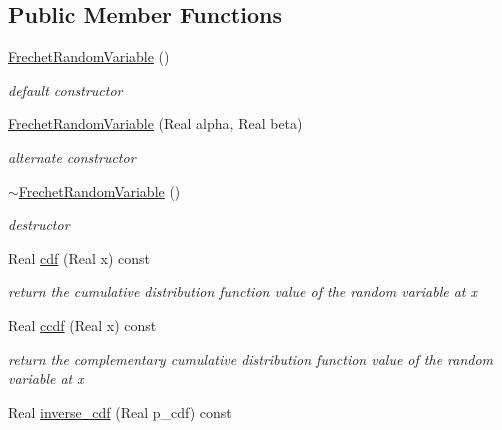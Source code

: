 \subsection*{Public Member Functions}
\begin{DoxyCompactItemize}
\item 
\hyperlink{classPecos_1_1FrechetRandomVariable_ae4779be11834d22e5aabb3d4c8a4f9ca}{Frechet\+Random\+Variable} ()\label{classPecos_1_1FrechetRandomVariable_ae4779be11834d22e5aabb3d4c8a4f9ca}

\begin{DoxyCompactList}\small\item\em default constructor \end{DoxyCompactList}\item 
\hyperlink{classPecos_1_1FrechetRandomVariable_a80a163a727244db9fd1a5eae1bc2137d}{Frechet\+Random\+Variable} (Real alpha, Real beta)\label{classPecos_1_1FrechetRandomVariable_a80a163a727244db9fd1a5eae1bc2137d}

\begin{DoxyCompactList}\small\item\em alternate constructor \end{DoxyCompactList}\item 
\hyperlink{classPecos_1_1FrechetRandomVariable_a06711dd01877399b0637eb2fde1a13f2}{$\sim$\+Frechet\+Random\+Variable} ()\label{classPecos_1_1FrechetRandomVariable_a06711dd01877399b0637eb2fde1a13f2}

\begin{DoxyCompactList}\small\item\em destructor \end{DoxyCompactList}\item 
Real \hyperlink{classPecos_1_1FrechetRandomVariable_addd564e7f4f314e12d38df74d845f0d8}{cdf} (Real x) const \label{classPecos_1_1FrechetRandomVariable_addd564e7f4f314e12d38df74d845f0d8}

\begin{DoxyCompactList}\small\item\em return the cumulative distribution function value of the random variable at x \end{DoxyCompactList}\item 
Real \hyperlink{classPecos_1_1FrechetRandomVariable_a23c3b599e7e4788a9a5e9e93c3dbaf4d}{ccdf} (Real x) const \label{classPecos_1_1FrechetRandomVariable_a23c3b599e7e4788a9a5e9e93c3dbaf4d}

\begin{DoxyCompactList}\small\item\em return the complementary cumulative distribution function value of the random variable at x \end{DoxyCompactList}\item 
Real \hyperlink{classPecos_1_1FrechetRandomVariable_a918a1aac05ca349ea5313eebcba46c3e}{inverse\+\_\+cdf} (Real p\+\_\+cdf) const \label{classPecos_1_1FrechetRandomVariable_a918a1aac05ca349ea5313eebcba46c3e}


\end{DoxyCompactItemize}
